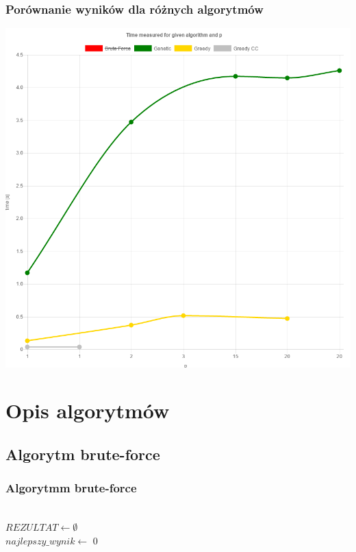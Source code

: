 \documentclass{beamer}
\begin{document}
\begin{frame}
\frametitle{Porównanie wyników dla różnych algorytmów}
\begin{center}
\includegraphics[width=0.5\paperwidth]{pics/p_t_chart.png}
\end{center}
\end{frame}


\section{Opis algorytmów}
\subsection{Algorytm brute-force}
\begin{frame}
\frametitle{Algorytmm brute-force}
\begin{algorithm}[H]
\SetAlgoLined
{}
~\\
$REZULTAT \longleftarrow \emptyset $ \\
$najlepszy\_wynik \longleftarrow $ 0 \\
\end{algorithm}
\end{frame}
\end{document}
